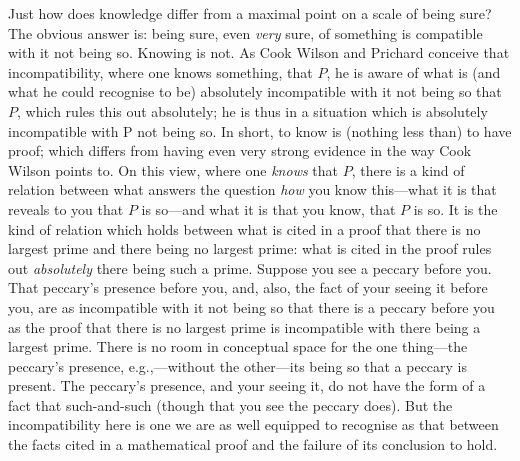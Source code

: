 Just how does knowledge differ from a maximal point on a scale of being sure? The obvious answer is: being sure, even \emph{very} sure, of something is compatible with it not being so. Knowing is not. As Cook Wilson and Prichard conceive that incompatibility, where one knows something, that \( P \), he is aware of what is (and what he could recognise to be) absolutely incompatible with it not being so that \( P \), which rules this out absolutely; he is thus in a situation which is absolutely incompatible with P not being so. In short, to know is (nothing less than) to have proof; which differs from having even very strong evidence in the way Cook Wilson points to. On this view, where one \emph{knows} that \( P \), there is a kind of relation between what answers the question \emph{how} you know this---what it is that reveals to you that \( P \) is so---and what it is that you know, that \( P \) is so. It is the kind of relation which holds between what is cited in a proof that there is no largest prime and there being no largest prime: what is cited in the proof rules out \emph{absolutely} there being such a prime. Suppose you see a peccary before you. That peccary’s presence before you, and, also, the fact of your seeing it before you, are as incompatible with it not being so that there is a peccary before you as the proof that there is no largest prime is incompatible with there being a largest prime. There is no room in conceptual space for the one thing---the peccary’s presence, e.g.,---without the other---its being so that a peccary is present. The peccary’s presence, and your seeing it, do not have the form of a fact that such-and-such (though that you see the peccary does). But the incompatibility here is one we are as well equipped to recognise as that between the facts cited in a mathematical proof and the failure of its conclusion to hold.

